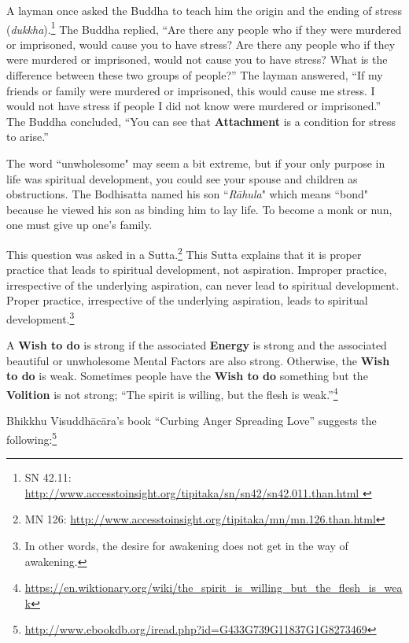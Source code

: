 
A layman once asked the Buddha to teach him the origin and the ending of stress (\textit{dukkha}).\footnote{SN 42.11: \url{ http://www.accesstoinsight.org/tipitaka/sn/sn42/sn42.011.than.html }} The Buddha replied, “Are there any people who if they were murdered or imprisoned, would cause you to have stress?  Are there any people who if they were murdered or imprisoned, would not cause you to have stress? What is the difference between these two groups of people?” The layman answered, “If my friends or family were murdered or imprisoned, this would cause me stress. I would not have stress if people I did not know were murdered or imprisoned.” The Buddha concluded, “You can see that \textbf{Attachment} is a condition for stress to arise.”

The word ``unwholesome" may seem a bit extreme, but if your only purpose in life was spiritual development, you could see your spouse and children as obstructions. The Bodhisatta named his son ``\textit{Rāhula}" which means ``bond" because he viewed his son as binding him to lay life. To become a monk or nun, one must give up one's family.


This question was asked in a Sutta.\footnote{MN 126: \url{http://www.accesstoinsight.org/tipitaka/mn/mn.126.than.html}} This Sutta explains that it is proper practice that leads to spiritual development, not aspiration. Improper practice, irrespective of the underlying aspiration, can never lead to spiritual development. Proper practice, irrespective of the underlying aspiration, leads to spiritual development.\footnote{In other words, the desire for awakening does not get in the way of awakening.}

A \textbf{Wish to do} is strong if the associated \textbf{Energy} is strong and the associated beautiful or unwholesome Mental Factors are also strong. Otherwise, the \textbf{Wish to do} is weak. Sometimes people have the \textbf{Wish to do} something but the \textbf{Volition} is not strong; “The spirit is willing, but the flesh is weak.”\footnote{\url{https://en.wiktionary.org/wiki/the_spirit_is_willing_but_the_flesh_is_weak}}

\pagebreak


Bhikkhu Visuddhācāra's book “Curbing Anger Spreading Love” suggests the following:\footnote{\url{http://www.ebookdb.org/iread.php?id=G433G739G11837G1G8273469}}

